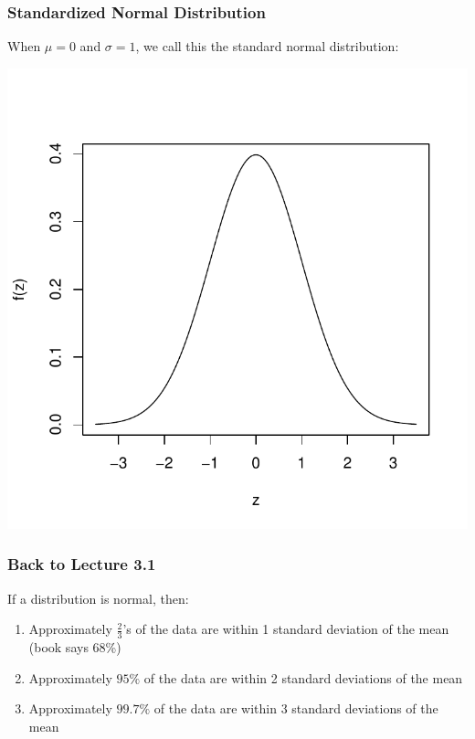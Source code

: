 \documentclass[slides]{beamer}
\newcommand{\blue}[1]{\textcolor{blue2}{#1}}
\begin{document}
\begin{frame}
\frametitle{Standardized Normal Distribution}
When $\mu=0$ and $\sigma=1$, we call this the \blue{standard normal distribution}:
\begin{center}
\includegraphics{figure/standard_normal}
\end{center}
\end{frame}



\begin{frame}
\frametitle{Back to Lecture 3.1}
If a distribution is normal, then:  
\begin{enumerate}
\item Approximately $\frac{2}{3}$'s of the data are within 1 standard deviation of the mean (book says 68\%)
\item Approximately $95\%$ of the data are within 2 standard deviations of the mean
\item Approximately $99.7\%$ of the data are within 3 standard deviations of the mean
\end{enumerate}
\end{frame}
\end{document}
